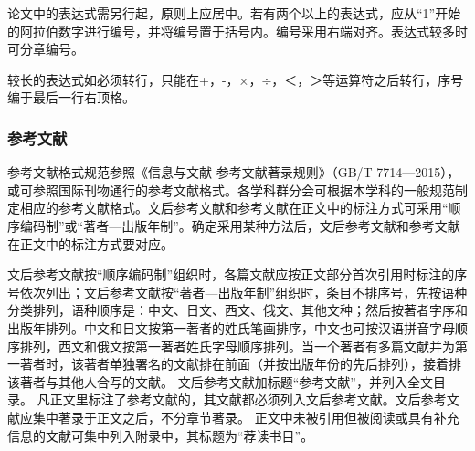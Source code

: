 论文中的表达式需另行起，原则上应居中。若有两个以上的表达式，应从“1”开始的阿拉伯数字进行编号，并将编号置于括号内。编号采用右端对齐。表达式较多时可分章编号。

较长的表达式如必须转行，只能在+，-，×，÷，＜，＞等运算符之后转行，序号编于最后一行右顶格。

\subsubsection{参考文献}
参考文献格式规范参照《信息与文献 参考文献著录规则》（GB/T 7714—2015），或可参照国际刊物通行的参考文献格式。各学科群分会可根据本学科的一般规范制定相应的参考文献格式。文后参考文献和参考文献在正文中的标注方式可采用“顺序编码制”或“著者—出版年制”。确定采用某种方法后，文后参考文献和参考文献在正文中的标注方式要对应。

文后参考文献按“顺序编码制”组织时，各篇文献应按正文部分首次引用时标注的序号依次列出；文后参考文献按“著者—出版年制”组织时，条目不排序号，先按语种分类排列，语种顺序是：中文、日文、西文、俄文、其他文种；然后按著者字序和出版年排列。中文和日文按第一著者的姓氏笔画排序，中文也可按汉语拼音字母顺序排列，西文和俄文按第一著者姓氏字母顺序排列。当一个著者有多篇文献并为第一著者时，该著者单独署名的文献排在前面（并按出版年份的先后排列），接着排该著者与其他人合写的文献。
文后参考文献加标题“参考文献”，并列入全文目录。
凡正文里标注了参考文献的，其文献都必须列入文后参考文献。文后参考文献应集中著录于正文之后，不分章节著录。
正文中未被引用但被阅读或具有补充信息的文献可集中列入附录中，其标题为“荐读书目”。

